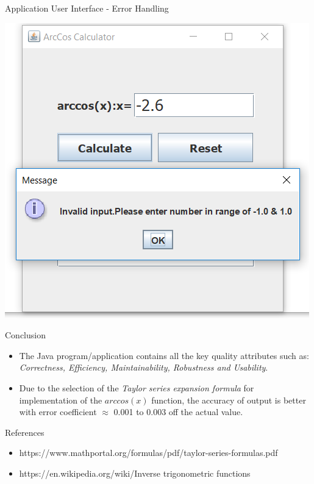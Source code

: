 \documentclass{beamer}
\begin{document}
\begin{frame}[fragile]
\begin{columns}[T]
\begin{column}{.35\textwidth}
\begin{block}{Application User Interface - Error Handling}
\begin{center}
    \includegraphics[width=.60\columnwidth]{NotWorking_negative_input.PNG}
\end{center}
\end{block}

\begin{block}{Conclusion}
\begin{itemize}
    \item The Java program/application contains all the key quality attributes such as: \textit{Correctness, Efficiency, Maintainability, Robustness and Usability}. 
    \item Due to the selection of the \textit{Taylor series expansion formula} for implementation of the $arccos(x)$ function, the accuracy of output is better with error coefficient $\approx$ 0.001 to 0.003 off the actual value.
\end{itemize}
\end{block}

\begin{block}{References}
\begin{itemize}
    \small\item https://www.mathportal.org/formulas/pdf/taylor-series-formulas.pdf
    \small\item https://en.wikipedia.org/wiki/Inverse trigonometric functions
\end{itemize}
\end{block}

\end{column}

\end{columns}

\end{frame}
\end{document}
